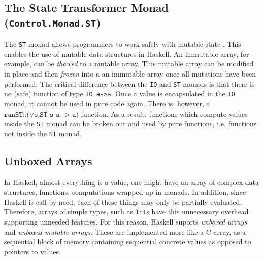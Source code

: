 \subsection{The State Transformer Monad (\texttt{Control.Monad.ST})\label{sec:st}}
The \texttt{ST} {monad} allows programmers to work safely with mutable state \cite{rwh}. This enables the use of {mutable} data structures in {Haskell}. An immutable array, for example, can be \textit{thawed} to a mutable array. This mutable array can be modified in place and then \textit{frozen} into a an immutable array once all mutations have been performed. The critical difference between the \texttt{IO} and \texttt{ST} {monads} is that there is no (safe) function of type \texttt{IO a->a}. Once a value is encapsulated in the \texttt{IO} monad, it cannot be used in pure code again. There is, however, a $\texttt{runST} \texttt{::} \texttt{(}\forall \texttt{s}.\texttt{ST s a -> a)}$ function. As a result, functions which compute values inside the \texttt{ST} {monad} can be broken out and used by pure functions, i.e. functions not inside the \texttt{ST} monad. 

\subsection{Unboxed Arrays}
In {Haskell}, almost everything is a value, one might have an array of complex data structures, functions, computations wrapped up in monads. In addition, since {Haskell} is call-by-need, each of these things may only be partially evaluated. Therefore, arrays of simple types, such as \texttt{Int}s have this unnecessary overhead supporting unneeded features. For this reason, {Haskell} suports \textit{unboxed arrays} and \textit{unboxed mutable arrays}. These are implemented more like a {C} array, as a sequential block of memory containing sequential concrete values as opposed to pointers to values.

